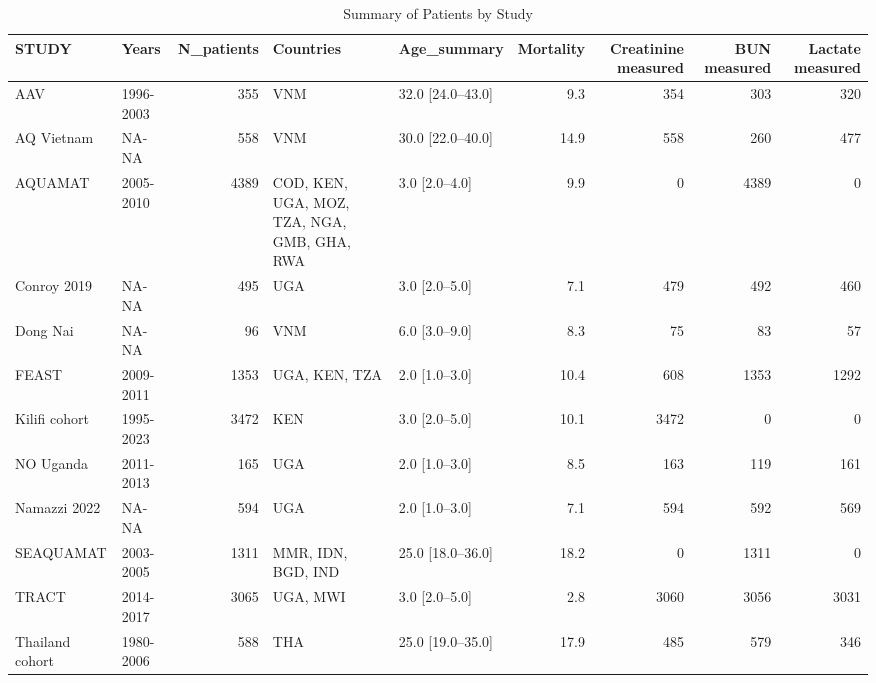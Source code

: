 \begin{table}

\caption{Summary of Patients by Study}
\centering
\begin{tabular}[t]{llrllrrrr}
\toprule
STUDY & Years & N\_patients & Countries & Age\_summary & Mortality & Creatinine measured & BUN measured & Lactate measured\\
\midrule
AAV & 1996-2003 & 355 & VNM & 32.0 [24.0–43.0] & 9.3 & 354 & 303 & 320\\
AQ Vietnam & NA-NA & 558 & VNM & 30.0 [22.0–40.0] & 14.9 & 558 & 260 & 477\\
AQUAMAT & 2005-2010 & 4389 & COD, KEN, UGA, MOZ, TZA, NGA, GMB, GHA, RWA & 3.0 [2.0–4.0] & 9.9 & 0 & 4389 & 0\\
Conroy 2019 & NA-NA & 495 & UGA & 3.0 [2.0–5.0] & 7.1 & 479 & 492 & 460\\
Dong Nai & NA-NA & 96 & VNM & 6.0 [3.0–9.0] & 8.3 & 75 & 83 & 57\\
\addlinespace
FEAST & 2009-2011 & 1353 & UGA, KEN, TZA & 2.0 [1.0–3.0] & 10.4 & 608 & 1353 & 1292\\
Kilifi cohort & 1995-2023 & 3472 & KEN & 3.0 [2.0–5.0] & 10.1 & 3472 & 0 & 0\\
NO Uganda & 2011-2013 & 165 & UGA & 2.0 [1.0–3.0] & 8.5 & 163 & 119 & 161\\
Namazzi 2022 & NA-NA & 594 & UGA & 2.0 [1.0–3.0] & 7.1 & 594 & 592 & 569\\
SEAQUAMAT & 2003-2005 & 1311 & MMR, IDN, BGD, IND & 25.0 [18.0–36.0] & 18.2 & 0 & 1311 & 0\\
\addlinespace
TRACT & 2014-2017 & 3065 & UGA, MWI & 3.0 [2.0–5.0] & 2.8 & 3060 & 3056 & 3031\\
Thailand cohort & 1980-2006 & 588 & THA & 25.0 [19.0–35.0] & 17.9 & 485 & 579 & 346\\
\bottomrule
\end{tabular}
\end{table}
